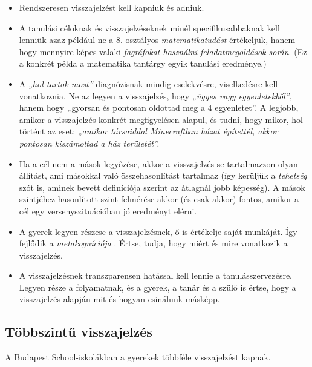 \begin{itemize}
\item
  Rendszeresen visszajelzést kell kapniuk és adniuk.
\item
  A tanulási céloknak és visszajelzéseknek minél specifikusabbaknak kell
  lenniük azaz például ne a 8. osztályos \emph{matematikatudást}
  értékeljük, hanem hogy mennyire képes valaki \emph{fagráfokat
  használni feladatmegoldások során}. (Ez a konkrét példa a matematika
  tantárgy egyik tanulási eredménye.)
\item
  A \emph{„hol tartok most''} diagnózisnak mindig cselekvésre,
  viselkedésre kell vonatkoznia. Ne az legyen a visszajelzés, hogy
  \emph{„ügyes vagy egyenletekből''}, hanem hogy {„gyorsan és pontosan
  oldottad meg a 4 egyenletet''}. A legjobb, amikor a visszajelzés
  konkrét megfigyelésen alapul, és tudni, hogy mikor, hol történt az
  eset: \emph{„amikor társaiddal Minecraftban házat építettél, akkor
  pontosan kiszámoltad a ház területét''.}
\item
  Ha a cél nem a mások legyőzése, akkor a visszajelzés se tartalmazzon
  olyan állítást, ami másokkal való összehasonlítást tartalmaz (így kerüljük a \emph{tehetség}
  szót is, aminek bevett definíciója szerint az átlagnál jobb képesség).
  A mások szintjéhez hasonlított szint felmérése akkor (és csak akkor) fontos, amikor a
  cél egy versenyszituációban jó eredményt elérni.
\item
  A gyerek legyen részese a visszajelzésnek, ő is értékelje saját
  munkáját. Így fejlődik a
  {\emph{metakogníciója}} {\autocite{eef:18}}.
  Értse, tudja, hogy miért és mire vonatkozik a visszajelzés.
\item
  A visszajelzésnek transzparensen hatással kell lennie a
  tanulásszervezésre. Legyen része a folyamatnak, és a gyerek, a tanár és
  a szülő is értse, hogy a visszajelzés alapján mit és hogyan csinálunk
  másképp.
\end{itemize}

\hypertarget{tobbszintu-visszajelzes}{%
\subsection{Többszintű visszajelzés}\label{tobbszintu-visszajelzes}}

A Budapest School-iskolákban a gyerekek többféle visszajelzést kapnak.

